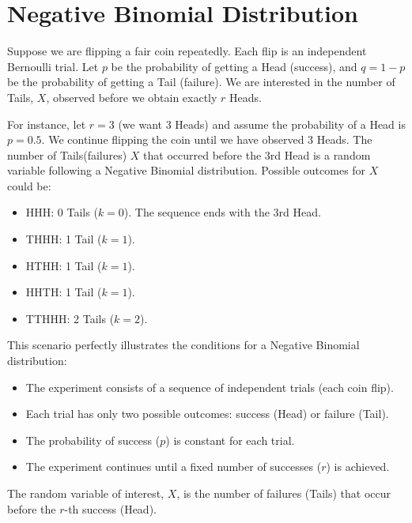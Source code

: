\chapter{Negative Binomial Distribution}
\label{chap:negative-binomial-distribution}

\begin{eg}
  \label{eg:coin-toss-nbd}
  Suppose we are flipping a fair coin repeatedly. Each flip is an independent
  Bernoulli trial. Let \(p\) be the probability of getting a Head (success), and
  \(q=1-p\) be the probability of getting a Tail (failure). We are interested in
  the number of Tails, \(X\), observed before we obtain exactly \(r\) Heads.

  For instance, let \(r=3\) (we want 3 Heads) and assume the probability of a
  Head is \(p=0.5\). We continue flipping the coin until we have observed 3
  Heads. The number of Tails(failures) \(X\) that occurred before the 3rd Head
  is a random variable following a Negative Binomial distribution.
  Possible outcomes for \(X\) could be:
  \begin{itemize}
    \item HHH: 0 Tails (\(k=0\)). The sequence ends with the 3rd Head.
    \item THHH: 1 Tail (\(k=1\)).
    \item HTHH: 1 Tail (\(k=1\)).
    \item HHTH: 1 Tail (\(k=1\)).
    \item TTHHH: 2 Tails (\(k=2\)).
  \end{itemize}
  This scenario perfectly illustrates the conditions for a Negative Binomial
  distribution:
  \begin{itemize}
    \item The experiment consists of a sequence of independent trials (each coin
      flip).
    \item Each trial has only two possible outcomes: success (Head) or failure
      (Tail).
    \item The probability of success (\(p\)) is constant for each trial.
    \item The experiment continues until a fixed number of successes (\(r\)) is
      achieved.
  \end{itemize}
  The random variable of interest, \(X\), is the number of failures (Tails) that
  occur before the \(r\)-th success (Head).
\end{eg}

